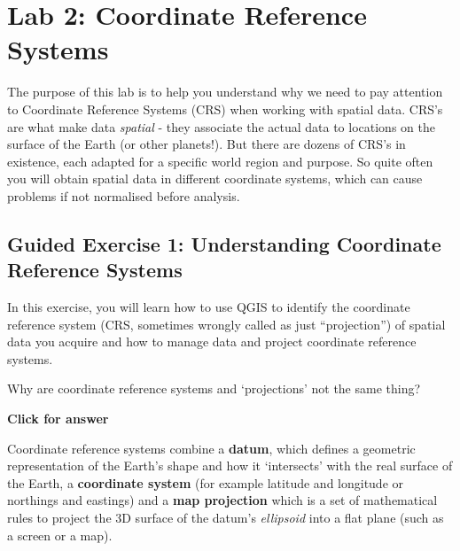 \documentclass[
  letterpaper,
  DIV=11,
  numbers=noendperiod]{scrreprt}
\begin{document}
\chapter{Lab 2: Coordinate Reference Systems}\label{sec-excrs}

The purpose of this lab is to help you understand why we need to pay
attention to Coordinate Reference Systems (CRS) when working with
spatial data. CRS's are what make data \emph{spatial} - they associate
the actual data to locations on the surface of the Earth (or other
planets!). But there are dozens of CRS's in existence, each adapted for
a specific world region and purpose. So quite often you will obtain
spatial data in different coordinate systems, which can cause problems
if not normalised before analysis.

\section{Guided Exercise 1: Understanding Coordinate Reference
Systems}\label{guided-exercise-1-understanding-coordinate-reference-systems}

In this exercise, you will learn how to use QGIS to identify the
coordinate reference system (CRS, sometimes wrongly called as just
``projection'') of spatial data you acquire and how to manage data and
project coordinate reference systems.

\begin{tcolorbox}[enhanced jigsaw, coltitle=black, toprule=.15mm, breakable, opacitybacktitle=0.6, left=2mm, colback=white, leftrule=.75mm, rightrule=.15mm, colbacktitle=quarto-callout-important-color!10!white, toptitle=1mm, titlerule=0mm, colframe=quarto-callout-important-color-frame, arc=.35mm, bottomtitle=1mm, opacityback=0, bottomrule=.15mm, title=\textcolor{quarto-callout-important-color}{\faExclamation}\hspace{0.5em}{Stop and Think}]

Why are coordinate reference systems and `projections' not the same
thing?

\end{tcolorbox}

\begin{tcolorbox}[enhanced jigsaw, toprule=.15mm, breakable, left=2mm, colframe=quarto-callout-important-color-frame, colback=white, arc=.35mm, leftrule=.75mm, opacityback=0, rightrule=.15mm, bottomrule=.15mm]

\vspace{-3mm}\textbf{Click for answer}\vspace{3mm}

Coordinate reference systems combine a \textbf{datum}, which defines a
geometric representation of the Earth's shape and how it `intersects'
with the real surface of the Earth, a \textbf{coordinate system} (for
example latitude and longitude or northings and eastings) and a
\textbf{map projection} which is a set of mathematical rules to project
the 3D surface of the datum's \emph{ellipsoid} into a flat plane (such
as a screen or a map).

\end{tcolorbox}
\end{document}
